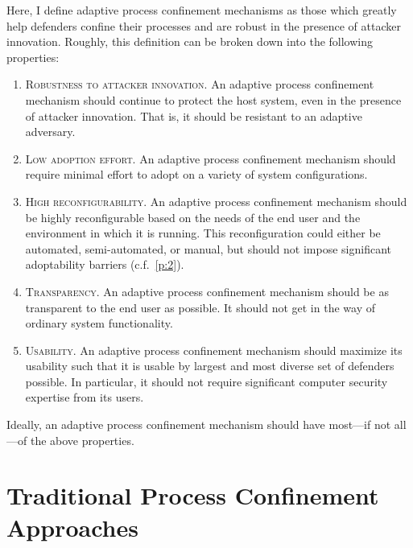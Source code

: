 \documentclass[dvipsnames, 12pt]{article}
\begin{document}
Here, I define adaptive process confinement mechanisms as those which greatly
help defenders confine their processes and are robust in the presence of
attacker innovation. Roughly, this definition can be broken down into the
following properties:
\begin{enumerate}[label=\bfseries P\arabic*., ref=P\arabic*, labelindent=2em]
    \item \label{p:1} \textsc{Robustness to attacker innovation.} An adaptive
    process confinement mechanism should continue to protect the host system,
    even in the presence of attacker innovation. That is, it should be resistant
    to an adaptive adversary.

    \item \label{p:2} \textsc{Low adoption effort.} An adaptive process
    confinement mechanism should require minimal effort to adopt on a variety of
    system configurations.

    \item \label{p:3} \textsc{High reconfigurability.} An adaptive process
    confinement mechanism should be highly reconfigurable based on the needs of
    the end user and the environment in which it is running. This
    reconfiguration could either be automated, semi-automated, or manual, but
    should not impose significant adoptability barriers (c.f.~\ref{p:2}).

    \item \label{p:4} \textsc{Transparency.} An adaptive process confinement
    mechanism should be as transparent to the end user as possible. It should
    not get in the way of ordinary system functionality.

    \item \label{p:5} \textsc{Usability.} An adaptive process confinement
    mechanism should maximize its usability such that it is usable by largest
    and most diverse set of defenders possible. In particular, it should not
    require significant computer security expertise from its users.
\end{enumerate}
Ideally, an adaptive process confinement mechanism should have most---if not
all---of the above properties.

\section{Traditional Process Confinement Approaches}
\label{sec:traditional}
\end{document}
